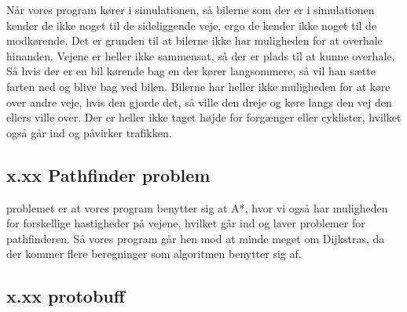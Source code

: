 \vspace{5mm}

Når vores program kører i simulationen, så bilerne som der er i simulationen kender de ikke noget til de sideliggende veje, ergo de kender ikke noget til de modkørende. Det er grunden til at bilerne ikke har muligheden for at overhale hinanden. Vejene er heller ikke sammensat, så der er plads til at kunne overhale. Så hvis der er en bil kørende bag en der kører langsommere, så vil han sætte farten ned og blive bag ved bilen. Bilerne har heller ikke muligheden for at køre over andre veje, hvis den gjorde det, så ville den dreje og køre langs den vej den ellers ville over. Der er heller ikke taget højde for forgænger eller cyklister, hvilket også går ind og påvirker trafikken. 

\subsection{x.xx Pathfinder problem}
problemet er at vores program benytter sig at A*, hvor vi også har muligheden for forskellige hastigheder på vejene, hvilket går ind og laver problemer for pathfinderen. Så vores program går hen mod at minde meget om Dijkstras, da der kommer flere beregninger som algoritmen benytter sig af.


\subsection{x.xx protobuff}



